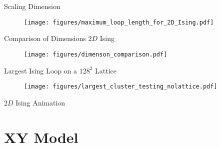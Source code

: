 \documentclass[10pt]{beamer}
\begin{document}
\begin{frame}{Scaling Dimension}
    \begin{figure}[h!]
        \centering
            \texttt{[image: figures/maximum\_loop\_length\_for\_2D\_Ising.pdf]}
    \end{figure}
\end{frame}

\begin{frame}{Comparison of Dimensions $2D$ Ising}
    \begin{figure}[h!]
        \centering
            \texttt{[image: figures/dimenson\_comparison.pdf]}
    \end{figure}
\end{frame}

\begin{frame}{Largest Ising Loop on a $128^2$ Lattice}
    \begin{figure}[h!]
        \centering
            \texttt{[image: figures/largest\_cluster\_testing\_nolattice.pdf]}
    \end{figure}
\end{frame}

\begin{frame}{$2D$ Ising Animation}
\end{frame}

\section{XY Model}
\end{document}
